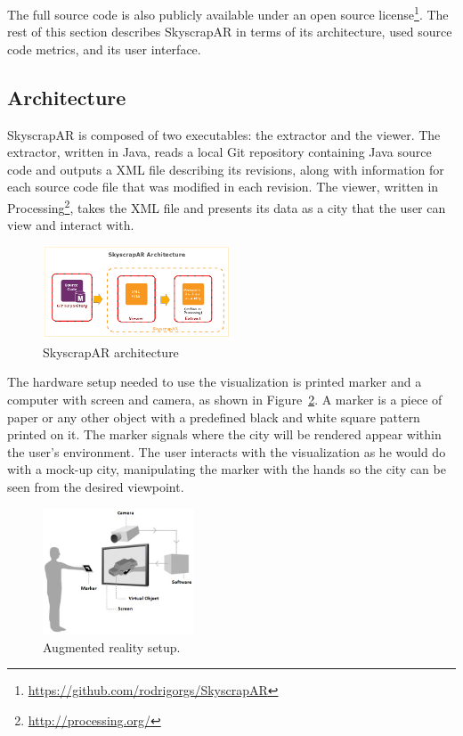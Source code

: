 The full source code is also publicly available under an open source license\footnote{\url{https://github.com/rodrigorgs/SkyscrapAR}}. The rest of this section describes SkyscrapAR in terms of its architecture, used source code metrics, and its user interface.

\subsection{Architecture} \label{sec:architecture}
SkyscrapAR is composed of two executables: the extractor and the viewer. The extractor, written in Java, reads a local Git repository containing Java source code and outputs a XML file describing its revisions, along with information for each source code file that was modified in each revision. The viewer, written in Processing\footnote{\url{http://processing.org/}}, takes the XML file and presents its data as a city that the user can view and interact with.

\begin{figure}[ht!]
 \centering
 \includegraphics[width=0.5\textwidth, bb=0 0 547 269]{./images/architecture}
 \caption{SkyscrapAR architecture}
 \label{fig:architecture}
\end{figure}

The hardware setup needed to use the visualization is printed marker and a computer with screen and camera, as shown in Figure~\ref{fig:setup}. A marker is a piece of paper or any other object with a predefined black and white square pattern printed on it. The marker signals where the city will be rendered appear within the user's environment. The user interacts with the visualization as he would do with a mock-up city, manipulating the marker with the hands so the city can be seen from the desired viewpoint.

\begin{figure}[h!]
 \centering
 \includegraphics[width=0.4\textwidth, bb=0 0 486 406]{./images/howtowork.jpg}
 \caption{Augmented reality setup.}
 \label{fig:setup}
\end{figure}

